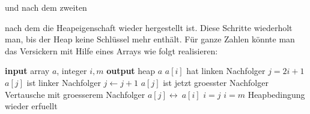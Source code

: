 \documentclass[tikz,12pt]{article}
\begin{document}
und nach dem zweiten
\begin{center}
\end{center}
nach dem die Heapeigenschaft wieder hergestellt ist.
Diese Schritte wiederholt man, bis der Heap keine Schlüssel mehr enthält. 
Für ganze Zahlen könnte man das Versickern mit Hilfe eines Arrays wie folgt realisieren:
\begin{algorithmic}[1]
  \State \textbf{input} array $a$, integer $i,m$
  \State \textbf{output} heap $a$
  \Comment $a[i]$ hat linken Nachfolger
  \State $j=2i+1$
  \Comment $a[j]$ ist linker Nachfolger
  \State $j\leftarrow j+1$
  \Comment $a[j]$ ist jetzt groesster Nachfolger
  \EndIf
  \EndIf
  \Comment Vertausche mit groesserem Nachfolger
  \State $a[j]\leftrightarrow\ a[i]$
  \State $i = j$
  \Else
  \State $i = m$
  \Comment Heapbedingung wieder erfuellt
  \EndIf
  \EndWhile
  \EndProcedure
\end{algorithmic}
\end{document}
